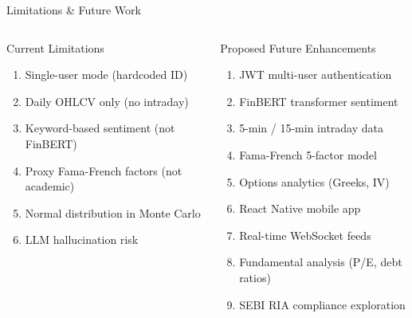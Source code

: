 \documentclass[aspectratio=169, 11pt]{beamer}
\begin{document}
\begin{frame}{Limitations \& Future Work}
\begin{columns}[T]
\begin{alertblock}{Current Limitations}
\small
\begin{enumerate}
  \item Single-user mode (hardcoded ID)
  \item Daily OHLCV only (no intraday)
  \item Keyword-based sentiment (not FinBERT)
  \item Proxy Fama-French factors (not academic)
  \item Normal distribution in Monte Carlo
  \item LLM hallucination risk
\end{enumerate}
\end{alertblock}

\begin{exampleblock}{Proposed Future Enhancements}
\small
\begin{enumerate}
  \item JWT multi-user authentication
  \item FinBERT transformer sentiment
  \item 5-min / 15-min intraday data
  \item Fama-French 5-factor model
  \item Options analytics (Greeks, IV)
  \item React Native mobile app
  \item Real-time WebSocket feeds
  \item Fundamental analysis (P/E, debt ratios)
  \item SEBI RIA compliance exploration
\end{enumerate}
\end{exampleblock}
\end{columns}
\end{frame}
\end{document}
